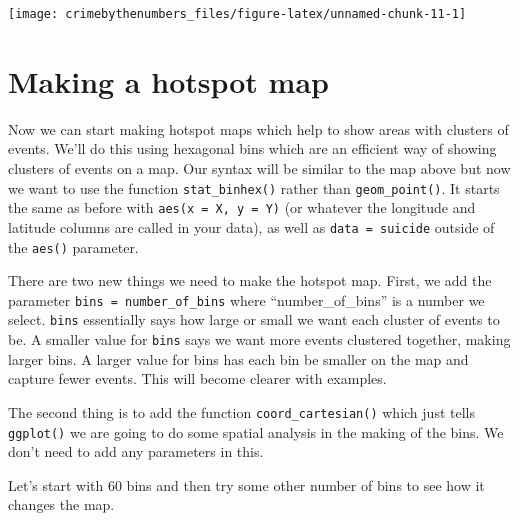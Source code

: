 \documentclass[
]{krantz}
\makeatletter
\newenvironment{Shaded}{\begin{snugshade}}{\end{snugshade}}
\newcommand{\AttributeTok}[1]{\textcolor[rgb]{0.61,0.61,0.61}{#1}}
\newcommand{\FunctionTok}[1]{\textcolor[rgb]{0,0,0}{#1}}
\newcommand{\NormalTok}[1]{#1}
\newcommand{\SpecialCharTok}[1]{\textcolor[rgb]{0,0,0}{#1}}
\newcommand{\StringTok}[1]{\textcolor[rgb]{0.5,0.5,0.5}{#1}}
\newenvironment{kframe}{%
\medskip{}
\setlength{\fboxsep}{.8em}
 \def\at@end@of@kframe{}%
 \ifinner\ifhmode%
  \def\at@end@of@kframe{\end{minipage}}%
  \begin{minipage}{\columnwidth}%
 \fi\fi%
 \def\FrameCommand##1{\hskip\@totalleftmargin \hskip-\fboxsep
 \colorbox{shadecolor}{##1}\hskip-\fboxsep
     \hskip-\linewidth \hskip-\@totalleftmargin \hskip\columnwidth}%
 \MakeFramed {\advance\hsize-\width
   \@totalleftmargin\z@ \linewidth\hsize
   \@setminipage}}%
 {\par\unskip\endMakeFramed%
 \at@end@of@kframe}
\renewenvironment{Shaded}{\begin{kframe}}{\end{kframe}}
\makeatother
\begin{document}
\begin{Shaded}
\end{Shaded}

\begin{center}\texttt{[image: crimebythenumbers\_files/figure-latex/unnamed-chunk-11-1]} \end{center}

\hypertarget{making-a-hotspot-map}{%
\section{Making a hotspot map}\label{making-a-hotspot-map}}

Now we can start making hotspot maps which help to show areas with clusters of events. We'll do this using hexagonal bins which are an efficient way of showing clusters of events on a map. Our syntax will be similar to the map above but now we want to use the function \texttt{stat\_binhex()} rather than \texttt{geom\_point()}. It starts the same as before with \texttt{aes(x\ =\ X,\ y\ =\ Y)} (or whatever the longitude and latitude columns are called in your data), as well as \texttt{data\ =\ suicide} outside of the \texttt{aes()} parameter.

There are two new things we need to make the hotspot map. First, we add the parameter \texttt{bins\ =\ number\_of\_bins} where ``number\_of\_bins'' is a number we select. \texttt{bins} essentially says how large or small we want each cluster of events to be. A smaller value for \texttt{bins} says we want more events clustered together, making larger bins. A larger value for bins has each bin be smaller on the map and capture fewer events. This will become clearer with examples.

The second thing is to add the function \texttt{coord\_cartesian()} which just tells \texttt{ggplot()} we are going to do some spatial analysis in the making of the bins. We don't need to add any parameters in this.

Let's start with 60 bins and then try some other number of bins to see how it changes the map.
\end{document}

